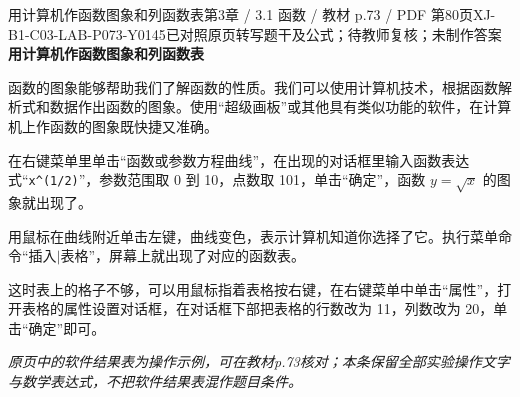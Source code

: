 \par\noindent\begin{minipage}{\linewidth}
\begin{bankitem}{用计算机作函数图象和列函数表}{第3章 / 3.1 函数 / 教材 p.73 / PDF 第80页}{XJ-B1-C03-LAB-P073-Y0145}{已对照原页转写题干及公式；待教师复核；未制作答案}
\textbf{用计算机作函数图象和列函数表}
\par 函数的图象能够帮助我们了解函数的性质。我们可以使用计算机技术，根据函数解析式和数据作出函数的图象。使用“超级画板”或其他具有类似功能的软件，在计算机上作函数的图象既快捷又准确。
\par 在右键菜单里单击“函数或参数方程曲线”，在出现的对话框里输入函数表达式“\texttt{x\textasciicircum(1/2)}”，参数范围取 0 到 10，点数取 101，单击“确定”，函数 $y=\sqrt x$ 的图象就出现了。
\par 用鼠标在曲线附近单击左键，曲线变色，表示计算机知道你选择了它。执行菜单命令“插入$\mid$表格”，屏幕上就出现了对应的函数表。
\par 这时表上的格子不够，可以用鼠标指着表格按右键，在右键菜单中单击“属性”，打开表格的属性设置对话框，在对话框下部把表格的行数改为 11，列数改为 20，单击“确定”即可。
\par\textit{原页中的软件结果表为操作示例，可在教材p.73核对；本条保留全部实验操作文字与数学表达式，不把软件结果表混作题目条件。}
\end{bankitem}
\end{minipage}\par\medskip

